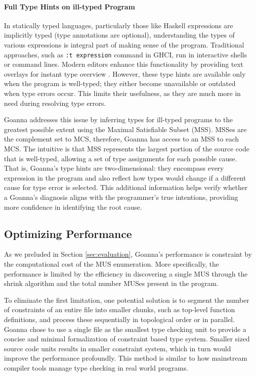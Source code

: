 \documentclass[pdflatex,sn-nature,Numbered]{sn-jnl}%
\begin{document}
\paragraph{Full Type Hints on ill-typed Program}

In statically typed languages, particularly those like Haskell  expressions are implicitly typed (type annotations are optional), understanding the types of various expressions is integral part of making sense of the program. Traditional approaches, such as \texttt{:t expression} command in GHCI, run in interactive shells or command lines. Modern editors enhance this functionality by providing text overlays for instant type overview . However, these type hints are available only when the program is well-typed; they either become unavailable or outdated when type errors occur. This limits their usefulness, as they are much more in need during resolving type errors.

Goanna addresses this issue by inferring types for ill-typed programs to the greatest possible extent using the Maximal Satisfiable Subset (MSS). MSSes are the complement set to MCS, therefore, Goanna has access to an MSS to each MCS. The intuitive is that MSS represents the largest portion of the source code that is well-typed, allowing a set of  type assignments for each possible cause. That is, Goanna's type hints are two-dimensional: they encompass every expression in the program and also reflect how types would change if a different cause for type error is selected. This additional information helps verify whether a Goanna's diagnosis aligns with the programmer's true intentions, providing more confidence in identifying the root cause.

\subsection{Optimizing Performance}

As we preluded in Section \ref{sec:evaluation}, Goanna's  performance is constraint by the computational cost of the MUS enumeration. More specifically, the performance is limited by the efficiency in discovering a single MUS through the shrink algorithm and the total number MUSes present in the program. 

To eliminate the first limitation, one potential solution is to segment the number of constraints of an entire file into smaller chunks, such as top-level function definitions, and process these sequentially in topological order or in parallel. Goanna chose to use a single file as the smallest type checking unit to provide a concise and minimal formalization of constraint based type system.  Smaller sized source code units results in smaller constraint system, which in turn would  improve the performance profoundly. This method is similar to how mainstream compiler tools manage type checking in real world programs. 
\end{document}
